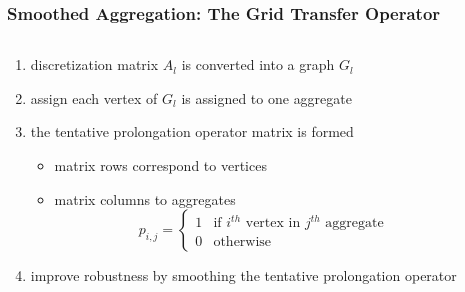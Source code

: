 \documentclass[xcolor=pdftex,table,10pt]{beamer}
\begin{document}
    \begin{frame}
        \frametitle{Smoothed Aggregation: The Grid Transfer Operator}

        \begin{columns}
        \begin{column}{6.7cm}
            \begin{enumerate}
                \item discretization matrix $A_l$ is converted into a graph $G_l$
                \item assign each {\color{blue!60}vertex} of $G_l$ is assigned to one {\color{red!60}aggregate} %
                \item the tentative prolongation operator matrix is formed 
                \begin{itemize}
                    \item matrix rows correspond to vertices
                    \item matrix columns to aggregates
                    \[
                        p_{i,j} = \begin{cases} 1 & \text{if } i^{th} \text{ vertex in } j^{th} \text{ aggregate} \\ 
                                        0 & \text{otherwise}
                              \end{cases}
                    \]
                \end{itemize}
                \item improve robustness by smoothing the tentative prolongation operator

            \end{enumerate}
        \end{column}

        \begin{column}{4cm}
            \begin{center}
\end{center}
\end{column}
\end{columns}
\end{frame}
\end{document}
